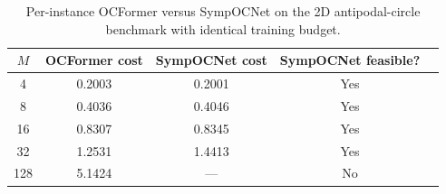 \begin{table}[htbp]
  \centering
  \caption{Per-instance OCFormer versus SympOCNet on the 2D antipodal-circle benchmark with identical training budget.}
  \label{tab:oc:sympocnet}
  \begin{tabular}{@{}ccccc@{}}
    \toprule
    $M$ & OCFormer cost & SympOCNet cost & SympOCNet feasible? \\
    \midrule
    4   & 0.2003 & 0.2001 & Yes \\
    8   & 0.4036 & 0.4046 & Yes \\
    16  & 0.8307 & 0.8345 & Yes \\
    32  & 1.2531 & 1.4413 & Yes \\
    128 & 5.1424 & --- & No \\
    \bottomrule
  \end{tabular}
\end{table}
